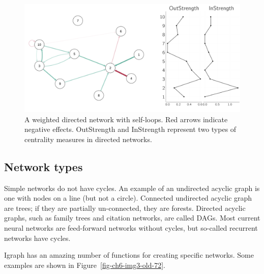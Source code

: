 \documentclass[
  a4paper,
  DIV=11,
  numbers=noendperiod]{scrreprt}
\begin{document}
\begin{figure}

{\centering \includegraphics{media/ch6/fig-ch6-img2-old-71.png}

}

\caption{\label{fig-ch6-img2-old-71}A weighted directed network with
self-loops. Red arrows indicate negative effects. OutStrength and
InStrength represent two types of centrality measures in directed
networks.}

\end{figure}

\hypertarget{sec-Network-types}{%
\subsection{Network types}\label{sec-Network-types}}

Simple networks do not have cycles. An example of an undirected acyclic
graph is one with nodes on a line (but not a circle). Connected
undirected acyclic graph are trees; if they are partially un-connected,
they are forests. Directed acyclic graphs, such as family trees and
citation networks, are called DAGs. Most current neural networks are
feed-forward networks without cycles, but so-called recurrent networks
have cycles.

Igraph has an amazing number of functions for creating specific
networks. Some examples are shown in Figure~\ref{fig-ch6-img3-old-72}.
\end{document}

